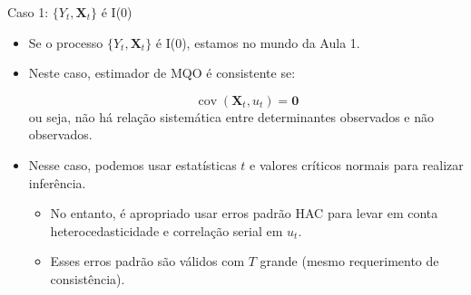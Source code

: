 \documentclass[11pt]{beamer}
\begin{document}
\begin{frame}{Caso 1: $\{Y_t,\boldsymbol{X}_t\}$ é I(0)}
	\begin{itemize}
		\item Se o processo $\{Y_t,\boldsymbol{X}_t\}$ é I(0), estamos no mundo da Aula 1.
		\item Neste caso, estimador de MQO é consistente se:
		
		$$\operatorname{cov}(\boldsymbol{X}_t, u_t) = \boldsymbol{0} $$
		ou seja, não há relação sistemática entre determinantes observados e não observados.
		\item Nesse caso, podemos usar estatísticas $t$ e valores críticos normais para realizar inferência.
		\begin{itemize}
			\item No entanto, é apropriado usar {\color{blue}erros padrão HAC} para levar em conta heterocedasticidade e correlação serial em $u_t$.
			\item Esses erros padrão são válidos com $T$ grande (mesmo requerimento de consistência).
		\end{itemize}
	\end{itemize}
\end{frame}
\end{document}
